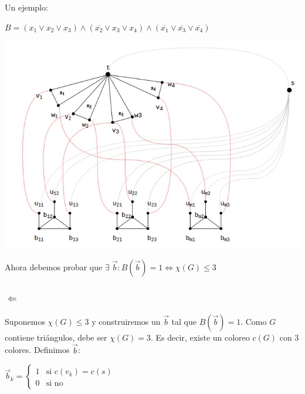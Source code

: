 \documentclass[10pt,a4paper]{article}
\begin{document}
Un ejemplo:

\begin{center}
$B = (x_1 \lor x_2 \lor x_3 ) \land (\overline{x_2} \lor x_3 \lor x_4) \land (\overline{x_1} \lor \overline{x_3} \lor \overline{x_4})$
\end{center}

\begin{center}

    \begin{adjustbox}{max size={\textwidth}{\textheight}}
        \includegraphics{definitions/3_color_np_complete2.jpg}
        \end{adjustbox}
    
\end{center}

Ahora debemos probar que $\exists \;\overrightarrow{b}:B(\overrightarrow{b}) = 1 \Leftrightarrow\chi(G) \leq 3$

\subsubsection*{$\Leftarrow$}

Suponemos $\chi(G) \leq 3$ y construiremos un $\overrightarrow{b}$ tal que $B(\overrightarrow{b}) = 1$. Como $G$ contiene triángulos, debe ser $\chi(G) = 3$. Es decir, existe un coloreo $c(G)$ con 3 colores. Definimos $\overrightarrow{b}$:

\begin{center}
$\overrightarrow{b}_k = \begin{cases} 1 & \text{si } c(v_k) = c(s)\\ 0 & \text{si no} \end{cases}$
\end{center}
\end{document}
